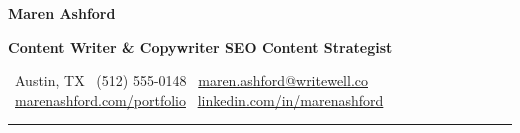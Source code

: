 \documentclass[10pt,a4paper]{article}
\begin{document}
{\centering
{\color{inkblack}\fontsize{25}{28}\selectfont\bfseries Maren Ashford}\par
\vspace{2pt}
{\color{accent}\fontsize{11.5}{13}\selectfont\bfseries Content Writer \& Copywriter \; \textbar\; SEO Content Strategist}\par
\vspace{5pt}
{\color{graytext}\small
\faMapMarker\ Austin, TX \quad
\faPhone\ (512) 555-0148 \quad
\faEnvelope\ \href{mailto:maren.ashford@writewell.co}{maren.ashford@writewell.co} \quad
\faGlobe\ \href{https://marenashford.com/portfolio}{marenashford.com/portfolio} \quad
\faLinkedin\ \href{https://linkedin.com/in/marenashford}{linkedin.com/in/marenashford}
}\par
}

\vspace{6pt}
{\color{accent}\rule{\linewidth}{1.4pt}}
\vspace{8pt}
\end{document}
